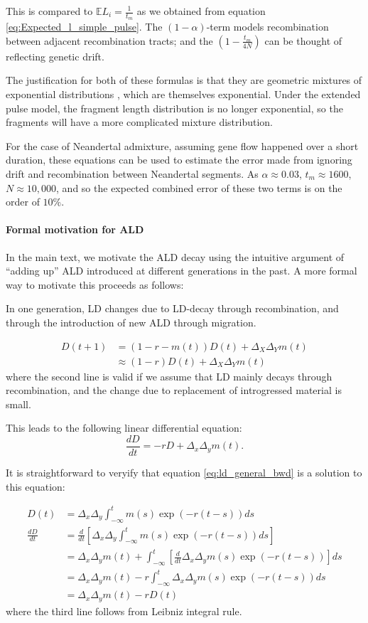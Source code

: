 \documentclass[11pt]{article}
\let\oldparagraph\paragraph
\renewcommand{\paragraph}[1]{\oldparagraph{#1}\mbox{}}
\begin{document}
This is compared to $\mathbb{E}L_i = \frac{1}{t_m}$ as we obtained from equation \ref{eq:Expected_l_simple_pulse}.
The $(1-\alpha)$-term models recombination between adjacent recombination tracts; and the $\left(1-\frac{t_m}{4N}\right)$ can be thought of reflecting genetic drift. 

The justification for both of these formulas is that they are geometric mixtures of exponential distributions \citep{liang_lengths_2014}, which are themselves exponential. Under the extended pulse model, the fragment length distribution is no longer exponential, so the fragments will have a more complicated mixture distribution. 

For the case of Neandertal admixture, assuming gene flow happened over a short duration, these equations can be used to estimate the error made from ignoring drift and recombination between Neandertal segments. As $\alpha \approx 0.03$, $t_m \approx 1600$, $N \approx 10,000$, and so the expected combined error of these two terms is on the order of $10\%$.
\paragraph{Formal motivation for ALD}
In the main text, we motivate the ALD decay using the intuitive argument of ``adding up'' ALD introduced at different generations in the past. A more formal way to motivate this proceeds as follows:

In one generation, LD changes due to LD-decay through recombination, and through the introduction of new ALD through migration.

\begin{align}
    D(t+1) &= (1-r-m(t)) D(t) + \Delta_X \Delta_Y m(t)\nonumber\\
    &\approx (1-r) D(t) + \Delta_X \Delta_Y m(t)
\end{align}
where the second line is valid if we assume that LD mainly decays through recombination, and the change due to replacement of introgressed material is small.

This leads to the following linear differential equation:
\begin{equation}
    \frac{dD}{dt} = -r D + \Delta_x\Delta_y m(t)\text{.}
\end{equation}

It is straightforward to veryify that equation \ref{eq:ld_general_bwd} is a solution to this equation:

\begin{align}
   D(t) &= \Delta_x\Delta_y\int_{-\infty}^t m(s)\exp(-r(t-s)) ds \nonumber \\
   \frac{d D}{dt} &= \frac{d}{dt}\left[ \Delta_x\Delta_y\int_{-\infty}^t m(s)\exp(-r(t-s)) ds \right]\nonumber\\
   &= \Delta_x\Delta_y m(t) + \int_{-\infty}^t \left[\frac{d}{dt}\Delta_x\Delta_y m(s)\exp(-r(t-s))\right]ds \nonumber\\
   &= \Delta_x\Delta_y m(t) - r \int_{-\infty}^t \Delta_x\Delta_y m(s)\exp(-r(t-s))ds \nonumber\\
   &= \Delta_x\Delta_y m(t) -r D(t)   
\end{align}
where the third line follows from Leibniz integral rule.
\end{document}
